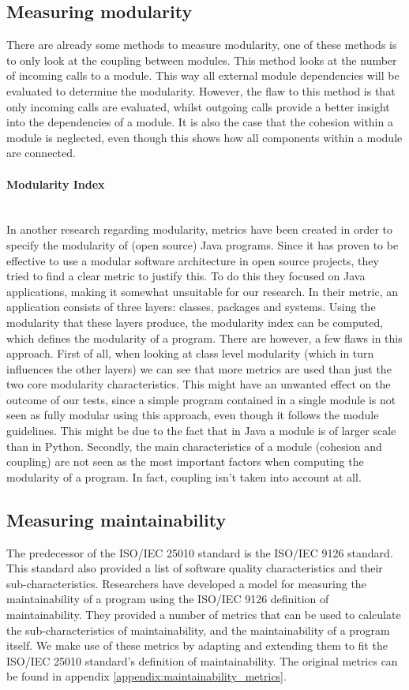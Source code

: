 \documentclass[twoside]{uva-inf-bachelor-thesis}
\newcommand{\myparagraph}[1]{\paragraph{#1}\mbox{}\\}
\begin{document}
\subsection*{Measuring modularity}
There are already some methods to measure modularity, one of these methods is to only look at the coupling between modules\cite{BetterCodeHub,visser2016building}. This method looks at the number of incoming calls to a module. This way all external module dependencies will be evaluated to determine the modularity. However, the flaw to this method is that only incoming calls are evaluated, whilst outgoing calls provide a better insight into the dependencies of a module. It is also the case that the cohesion within a module is neglected, even though this shows how all components within a module are connected.

\myparagraph{Modularity Index}
In another research regarding modularity, metrics have been created in order to specify the modularity of (open source) Java programs\cite{emanuel2013modularity}. Since it has proven to be effective to use a modular software architecture in open source projects, they tried to find a clear metric to justify this. To do this they focused on Java applications, making it somewhat unsuitable for our research. In their metric, an application consists of three layers: classes, packages and systems. Using the modularity that these layers produce, the modularity index can be computed, which defines the modularity of a program. There are however, a few flaws in this approach. First of all, when looking at class level modularity (which in turn influences the other layers) we can see that more metrics are used than just the two core modularity characteristics. This might have an unwanted effect on the outcome of our tests, since a simple program contained in a single module is not seen as fully modular using this approach, even though it follows the module guidelines. This might be due to the fact that in Java a module is of larger scale than in Python. Secondly, the main characteristics of a module (cohesion and coupling) are not seen as the most important factors when computing the modularity of a program. In fact, coupling isn't taken into account at all.

\subsection*{Measuring maintainability}
The predecessor of the ISO/IEC 25010 standard is the ISO/IEC 9126 standard\cite{ISO9126}. This standard also provided a list of software quality characteristics and their sub-characteristics. Researchers have developed a model for measuring the maintainability of a program using the ISO/IEC 9126 definition of maintainability\cite{heitlager2016practical}. They provided a number of metrics that can be used to calculate the sub-characteristics of maintainability, and the maintainability of a program itself. We make use of these metrics by adapting and extending them to fit the ISO/IEC 25010 standard's definition of maintainability. The original metrics can be found in appendix \ref{appendix:maintainability_metrics}.
\end{document}
